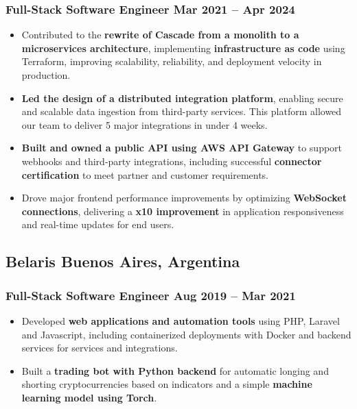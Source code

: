 \documentclass[11pt]{article} %
\begin{document}
\subsubsection{Full-Stack Software Engineer \hfill Mar 2021 -- Apr 2024}
\begin{itemize}
    \item {Contributed to the \textbf{rewrite of Cascade from a monolith to a microservices architecture}, implementing \textbf{infrastructure as code} using Terraform, improving scalability, reliability, and deployment velocity in production.}
    \item {\textbf{Led the design of a distributed integration platform}, enabling secure and scalable data ingestion from third-party services. This platform allowed our team to deliver 5 major integrations in under 4 weeks.}
    \item {\textbf{Built and owned a public API using AWS API Gateway} to support webhooks and third-party integrations, including successful \textbf{connector certification} to meet partner and customer requirements.}
    \item {Drove major frontend performance improvements by optimizing\textbf{ WebSocket connections}, delivering a \textbf{x10 improvement} in application responsiveness and real-time updates for end users.}
\end{itemize}

\subsection{Belaris \hfill Buenos Aires, Argentina}
\subsubsection{Full-Stack Software Engineer \hfill Aug 2019 -- Mar 2021}
\begin{itemize}
    \item{Developed \textbf{web applications and automation tools} using PHP, Laravel and Javascript, including containerized deployments with Docker and backend services for services and integrations.}
    \item{Built a \textbf{trading bot with Python backend} for automatic longing and shorting cryptocurrencies based on indicators and a simple \textbf{machine learning model using Torch}.}
\end{itemize}
\end{document}
